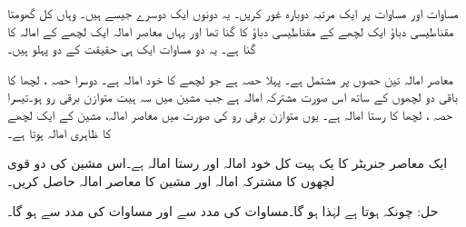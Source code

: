 مساوات  اور مساوات   پر ایک مرتبہ دوبارہ غور کریں۔ یہ دونوں ایک دوسرے جیسے ہیں۔ وہاں کل گھومتا مقناطیسی دباؤ ایک لچھے کے مقناطیسی دباؤ کا   گنا تھا اور یہاں معاصر امالہ ایک لچھے کے امالہ کا  گنا ہے۔ یہ دو مساوات  ایک ہی حقیقت کے دو پہلو ہیں۔

معاصر امالہ تین حصوں پر مشتمل ہے۔ پہلا حصہ  ہے جو  لچھے کا خود امالہ ہے۔ دوسرا حصہ ،  لچھا   کا باقی دو لچھوں کے ساتھ اس صورت  مشترکہ امالہ ہے جب مشین میں سہ ہیت متوازن برقی رو ہو۔تیسرا حصہ ،  لچھا   کا رستا امالہ ہے۔ یوں متوازن برقی رو کی صورت میں معاصر امالہ،  مشین کے ایک لچھے کا ظاہری امالہ ہوتا ہے۔

ایک معاصر جنریٹر کا یک ہیت  کل خود امالہ  اور رستا امالہ  ہے۔اس مشین کی دو قوی لچھوں  کا  مشترکہ امالہ اور مشین کا معاصر امالہ حاصل کریں۔

حل:\quad
چونکہ  ہوتا ہے   لہٰذا  ہو گا۔مساوات   کی مدد سے   اور مساوات   کی مدد سے   ہو گا۔
%

